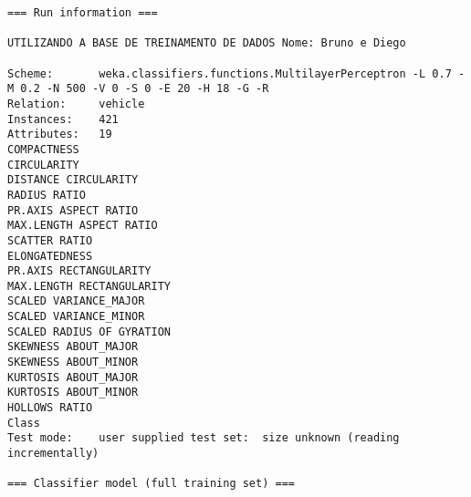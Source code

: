 \documentclass[
	article,			%
	11pt,				%
	oneside,			%
	a4paper,			%
	english,			%
	brazil,				%
	sumario=tradicional
	]{abntex2}
\begin{document}
\begin{lstlisting}
=== Run information ===

UTILIZANDO A BASE DE TREINAMENTO DE DADOS Nome: Bruno e Diego

Scheme:       weka.classifiers.functions.MultilayerPerceptron -L 0.7 -M 0.2 -N 500 -V 0 -S 0 -E 20 -H 18 -G -R
Relation:     vehicle
Instances:    421
Attributes:   19
COMPACTNESS
CIRCULARITY
DISTANCE CIRCULARITY
RADIUS RATIO
PR.AXIS ASPECT RATIO
MAX.LENGTH ASPECT RATIO
SCATTER RATIO
ELONGATEDNESS
PR.AXIS RECTANGULARITY
MAX.LENGTH RECTANGULARITY
SCALED VARIANCE_MAJOR
SCALED VARIANCE_MINOR
SCALED RADIUS OF GYRATION
SKEWNESS ABOUT_MAJOR
SKEWNESS ABOUT_MINOR
KURTOSIS ABOUT_MAJOR
KURTOSIS ABOUT_MINOR
HOLLOWS RATIO
Class
Test mode:    user supplied test set:  size unknown (reading incrementally)

=== Classifier model (full training set) ===


\end{lstlisting}
\end{document}
